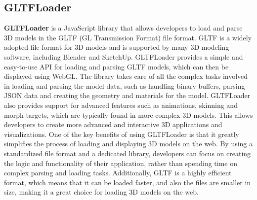 \subsection{GLTFLoader}
\textbf{GLTFLoader} is a JavaScript library that allows developers to load and parse 3D models in the GLTF 
(GL Transmission Format) file format. GLTF is a widely adopted file format for 3D models and is 
supported by many 3D modeling software, including Blender and SketchUp.
GLTFLoader provides a simple and easy-to-use API for loading and parsing GLTF models, 
which can then be displayed using WebGL. The library takes care of all the complex tasks 
involved in loading and parsing the model data, such as handling binary buffers, parsing 
JSON data and creating the geometry and materials for the model.
GLTFLoader also provides support for advanced features such as animations, skinning and morph 
targets, which are typically found in more complex 3D models. This allows developers to create 
more advanced and interactive 3D applications and visualizations.
One of the key benefits of using GLTFLoader is that it greatly simplifies the process of loading and 
displaying 3D models on the web. By using a standardized file format and a dedicated library, 
developers can focus on creating the logic and functionality of their application, rather than 
spending time on complex parsing and loading tasks.
Additionally, GLTF is a highly efficient format, which means that it can be loaded faster, 
and also the files are smaller in size, making it a great choice for loading 3D models on the web. \cite{GLTFLoader}

